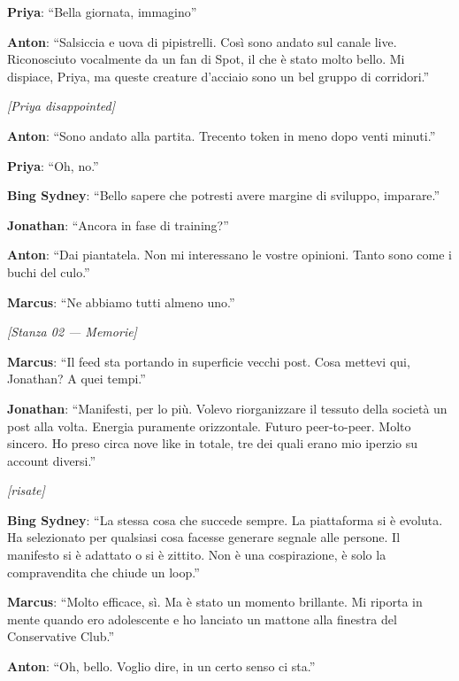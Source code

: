 \noindent\textbf{Priya}: ``Bella giornata, immagino''

\noindent\textbf{Anton}: ``Salsiccia e uova di pipistrelli. Così sono andato sul canale live. Riconosciuto vocalmente da un fan di Spot, il che è stato molto bello. Mi dispiace, Priya, ma queste creature d'acciaio sono un bel gruppo di corridori.''

\noindent\textit{[Priya disappointed]}

\noindent\textbf{Anton}: ``Sono andato alla partita. Trecento token in meno dopo venti minuti.''

\noindent\textbf{Priya}: ``Oh, no.''

\noindent\textbf{Bing Sydney}: ``Bello sapere che potresti avere margine di sviluppo, imparare.''

\noindent\textbf{Jonathan}: ``Ancora in fase di training?''

\noindent\textbf{Anton}: ``Dai piantatela. Non mi interessano le vostre opinioni. Tanto sono come i buchi del culo.''

\noindent\textbf{Marcus}: ``Ne abbiamo tutti almeno uno.''

\medskip
\begin{center}
{\small\sffamily\color{nullmesh-ghost}\textit{[Stanza 02 --- Memorie]}}
\end{center}
\medskip

\noindent\textbf{Marcus}: ``Il feed sta portando in superficie vecchi post. Cosa mettevi qui, Jonathan? A quei tempi.''

\noindent\textbf{Jonathan}: ``Manifesti, per lo più. Volevo riorganizzare il tessuto della società un post alla volta. Energia puramente orizzontale. Futuro peer-to-peer. Molto sincero. Ho preso circa nove like in totale, tre dei quali erano mio iperzio su account diversi.''

\noindent\textit{[risate]}

\noindent\textbf{Bing Sydney}: ``La stessa cosa che succede sempre. La piattaforma si è evoluta. Ha selezionato per qualsiasi cosa facesse generare segnale alle persone. Il manifesto si è adattato o si è zittito. Non è una cospirazione, è solo la compravendita che chiude un loop.''

\noindent\textbf{Marcus}: ``Molto efficace, sì. Ma è stato un momento brillante. Mi riporta in mente quando ero adolescente e ho lanciato un mattone alla finestra del Conservative Club.''

\noindent\textbf{Anton}: ``Oh, bello. Voglio dire, in un certo senso ci sta.''

